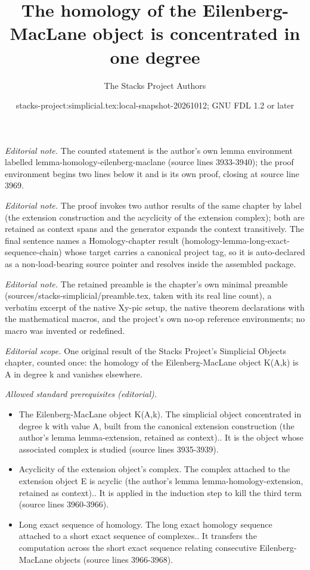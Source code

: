 \documentclass{stacks-project}
\title{The homology of the Eilenberg-MacLane object is concentrated in one degree}
\author{The Stacks Project Authors}
\date{stacks-project:simplicial.tex:local-snapshot-20261012; GNU FDL 1.2 or later}
\theoremstyle{plain}
\theoremstyle{definition}
\theoremstyle{remark}
\numberwithin{equation}{subsection}
\begin{document}
\maketitle
\noindent\textit{Editorial note.} The counted statement is the author's own lemma environment labelled lemma-homology-eilenberg-maclane (source lines 3933-3940); the proof environment begins two lines below it and is its own proof, closing at source line 3969.\par\medskip
\noindent\textit{Editorial note.} The proof invokes two author results of the same chapter by label (the extension construction and the acyclicity of the extension complex); both are retained as context spans and the generator expands the context transitively. The final sentence names a Homology-chapter result (homology-lemma-long-exact-sequence-chain) whose target carries a canonical project tag, so it is auto-declared as a non-load-bearing source pointer and resolves inside the assembled package.\par\medskip
\noindent\textit{Editorial note.} The retained preamble is the chapter's own minimal preamble (sources/stacks-simplicial/preamble.tex, taken with its real line count), a verbatim excerpt of the native Xy-pic setup, the native theorem declarations with the mathematical macros, and the project's own no-op reference environments; no macro was invented or redefined.\par\medskip
\noindent\textit{Editorial scope.} One original result of the Stacks Project's Simplicial Objects chapter, counted once: the homology of the Eilenberg-MacLane object K(A,k) is A in degree k and vanishes elsewhere.\par\medskip
\noindent\textit{Allowed standard prerequisites (editorial).}\begin{itemize}
\item The Eilenberg-MacLane object K(A,k). The simplicial object concentrated in degree k with value A, built from the canonical extension construction (the author's lemma lemma-extension, retained as context).. It is the object whose associated complex is studied (source lines 3935-3939).
\item Acyclicity of the extension object's complex. The complex attached to the extension object E is acyclic (the author's lemma lemma-homology-extension, retained as context).. It is applied in the induction step to kill the third term (source lines 3960-3966).
\item Long exact sequence of homology. The long exact homology sequence attached to a short exact sequence of complexes.. It transfers the computation across the short exact sequence relating consecutive Eilenberg-MacLane objects (source lines 3966-3968).
\end{itemize}\medskip
\end{document}

